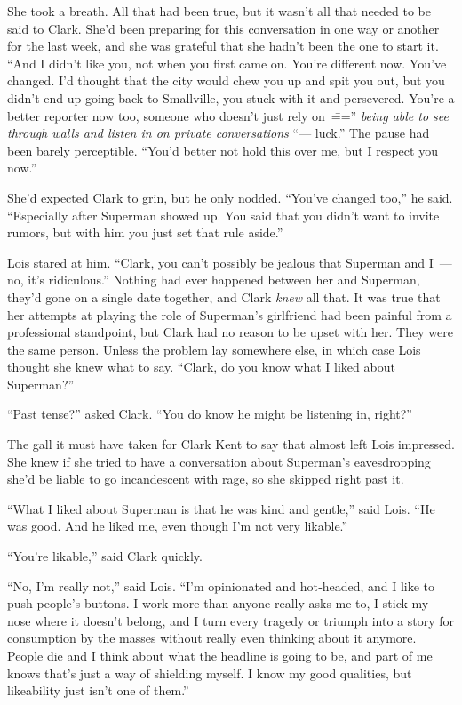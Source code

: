 She took a breath. All that had been true, but it wasn't all that needed
to be said to Clark. She'd been preparing for this conversation in one
way or another for the last week, and she was grateful that she hadn't
been the one to start it. ``And I didn't like you, not when you first
came on. You're different now. You've changed. I'd thought that the city
would chew you up and spit you out, but you didn't end up going back to
Smallville, you stuck with it and persevered. You're a better reporter
now too, someone who doesn't just rely on~\==='' \emph{being able to see
through walls and listen in on private conversations} ``--- luck.'' The
pause had been barely perceptible. ``You'd better not hold this over me,
but I respect you now.''

She'd expected Clark to grin, but he only nodded. ``You've changed
too,'' he said. ``Especially after Superman showed up. You said that you
didn't want to invite rumors, but with him you just set that rule
aside.''

Lois stared at him. ``Clark, you can't possibly be jealous that Superman
and I~--- no, it's ridiculous.'' Nothing had ever happened between her
and Superman, they'd gone on a single date together, and Clark
\emph{knew} all that. It was true that her attempts at playing the role
of Superman's girlfriend had been painful from a professional
standpoint, but Clark had no reason to be upset with her. They were the
same person. Unless the problem lay somewhere else, in which case Lois
thought she knew what to say. ``Clark, do you know what I liked about
Superman?''

``Past tense?'' asked Clark. ``You do know he might be listening in,
right?''

The gall it must have taken for Clark Kent to say that almost left Lois
impressed. She knew if she tried to have a conversation about Superman's
eavesdropping she'd be liable to go incandescent with rage, so she
skipped right past it.

``What I liked about Superman is that he was kind and gentle,'' said
Lois. ``He was good. And he liked me, even though I'm not very
likable.''

``You're likable,'' said Clark quickly.

``No, I'm really not,'' said Lois. ``I'm opinionated and hot‐headed, and
I like to push people's buttons. I work more than anyone really asks me
to, I stick my nose where it doesn't belong, and I turn every tragedy or
triumph into a story for consumption by the masses without really even
thinking about it anymore. People die and I think about what the
headline is going to be, and part of me knows that's just a way of
shielding myself. I know my good qualities, but likeability just isn't
one of them.''

